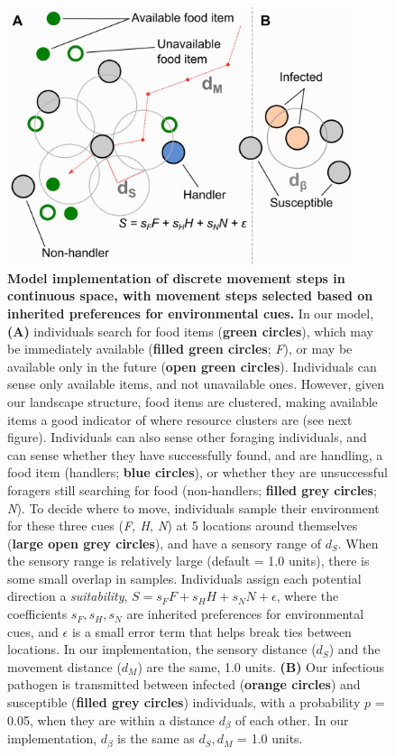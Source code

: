 \begin{figure}[!h]
    \centering
    \includegraphics[width=0.9\textwidth]{figures/pathomove/fig_schematic.png}
    \caption{
        \textbf{Model implementation of discrete movement steps in continuous space, with movement steps selected based on inherited preferences for environmental cues.} 
        In our model, \textbf{(A)} individuals search for food items (\textbf{green circles}), which may be immediately available (\textbf{filled green circles}; \emph{F}), or may be available only in the future (\textbf{open green circles}). 
        Individuals can sense only available items, and not unavailable ones. However, given our landscape structure, food items are clustered, making available items a good indicator of where resource clusters are (see next figure). 
        Individuals can also sense other foraging individuals, and can sense whether they have successfully found, and are handling, a food item (handlers; \textbf{blue circles}), or whether they are unsuccessful foragers still searching for food (non-handlers; \textbf{filled grey circles}; \emph{N}). 
        To decide where to move, individuals sample their environment for these three cues (\emph{F, H, N}) at 5 locations around themselves (\textbf{large open grey circles}), and have a sensory range of \(d_S\). 
        When the sensory range is relatively large (default = 1.0 units), there is some small overlap in samples. 
        Individuals assign each potential direction a \emph{suitability}, \(S = s_FF + s_HH + s_NN + \epsilon\), where the coefficients \(s_F, s_H, s_N\) are inherited preferences for environmental cues, and \(\epsilon\) is a small error term that helps break ties between locations. 
        In our implementation, the sensory distance (\(d_S\)) and the movement distance (\(d_M\)) are the same, 1.0 units. 
        \textbf{(B)} Our infectious pathogen is transmitted between infected (\textbf{orange circles}) and susceptible (\textbf{filled grey circles}) individuals, with a probability \(p\) = 0.05, when they are within a distance \(d_\beta\) of each other. 
        In our implementation, \(d_\beta\) is the same as \(d_S, d_M\) = 1.0 units.
    }\label{fig:patho_schematic}
\end{figure}

